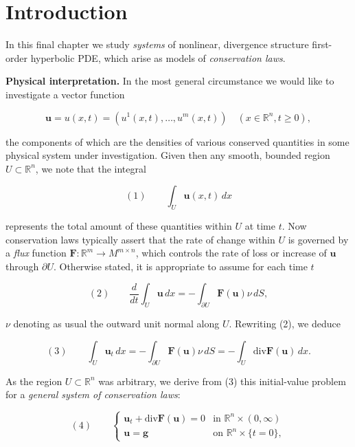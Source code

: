 
\section{Introduction}\label{sec:conservation-laws-introduction}

In this final chapter we study \textit{systems} of nonlinear, divergence structure first-order hyperbolic PDE, which arise as models of \textit{conservation laws}.

\textbf{Physical interpretation.} In the most general circumstance we would like to investigate a vector function

$$\mathbf{u} = u(x,t) = (u^1(x,t), \ldots, u^m(x,t)) \quad (x \in \mathbb{R}^n, t \geq 0),$$

the components of which are the densities of various conserved quantities in some physical system under investigation. Given then any smooth, bounded region $U \subset \mathbb{R}^n$, we note that the integral

$$(1) \qquad \int_U \mathbf{u}(x,t) \, dx$$

represents the total amount of these quantities within $U$ at time $t$. Now conservation laws typically assert that the rate of change within $U$ is governed by a \textit{flux} function $\mathbf{F}: \mathbb{R}^m \to M^{m \times n}$, which controls the rate of loss or increase of $\mathbf{u}$ through $\partial U$. Otherwise stated, it is appropriate to assume for each time $t$

$$(2) \qquad \frac{d}{dt} \int_U \mathbf{u} \, dx = - \int_{\partial U} \mathbf{F}(\mathbf{u})\nu \, dS,$$

$\nu$ denoting as usual the outward unit normal along $U$. Rewriting (2), we deduce

$$(3) \qquad \int_U \mathbf{u}_t \, dx = - \int_{\partial U} \mathbf{F}(\mathbf{u})\nu \, dS = - \int_U \text{div} \mathbf{F}(\mathbf{u}) \, dx.$$

As the region $U \subset \mathbb{R}^n$ was arbitrary, we derive from (3) this initial-value problem for a \textit{general system of conservation laws}:

$$(4) \qquad \begin{cases} \mathbf{u}_t + \text{div} \mathbf{F}(\mathbf{u}) = 0 & \text{in } \mathbb{R}^n \times (0, \infty) \\ \mathbf{u} = \mathbf{g} & \text{on } \mathbb{R}^n \times \{t = 0\}, \end{cases}$$

